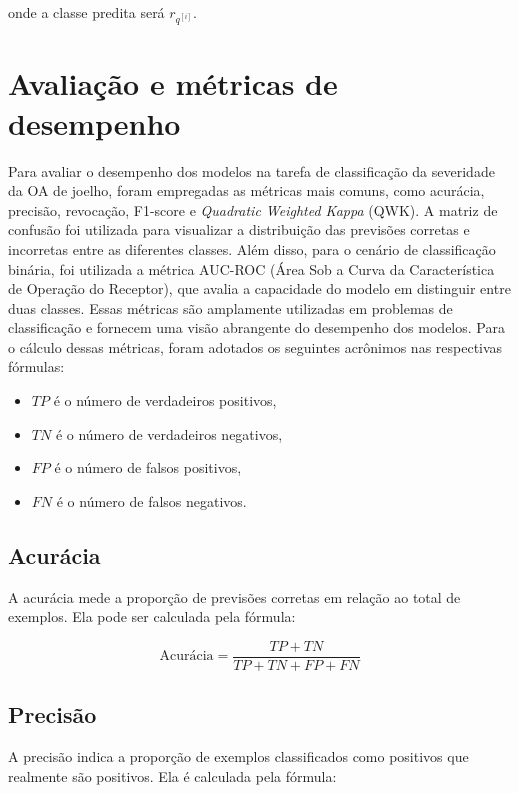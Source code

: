 onde a classe predita será $r_{q^{[i]}}$.

\section{Avaliação e métricas de desempenho} \label{sec:avaliacao-metricas}

Para avaliar o desempenho dos modelos na tarefa de classificação da severidade da OA de joelho, foram empregadas as métricas mais comuns, como acurácia, precisão, revocação, F1-score e \textit{Quadratic Weighted Kappa} (QWK). A matriz de confusão foi utilizada para visualizar a distribuição das previsões corretas e incorretas entre as diferentes classes. Além disso, para o cenário de classificação binária, foi utilizada a métrica AUC-ROC (Área Sob a Curva da Característica de Operação do Receptor), que avalia a capacidade do modelo em distinguir entre duas classes. Essas métricas são amplamente utilizadas em problemas de classificação e fornecem uma visão abrangente do desempenho dos modelos. Para o cálculo dessas métricas, foram adotados os seguintes acrônimos nas respectivas fórmulas:

\begin{itemize}
    \item $TP$ é o número de verdadeiros positivos,
    \item $TN$ é o número de verdadeiros negativos,
    \item $FP$ é o número de falsos positivos,
    \item $FN$ é o número de falsos negativos.
\end{itemize}

\subsection{Acurácia}
A acurácia mede a proporção de previsões corretas em relação ao total de exemplos. Ela pode ser calculada pela fórmula:

\begin{equation}
    \text{Acurácia} = \frac{TP + TN}{TP + TN + FP + FN}
\end{equation}

\subsection{Precisão}
A precisão indica a proporção de exemplos classificados como positivos que realmente são positivos. Ela é calculada pela fórmula:

